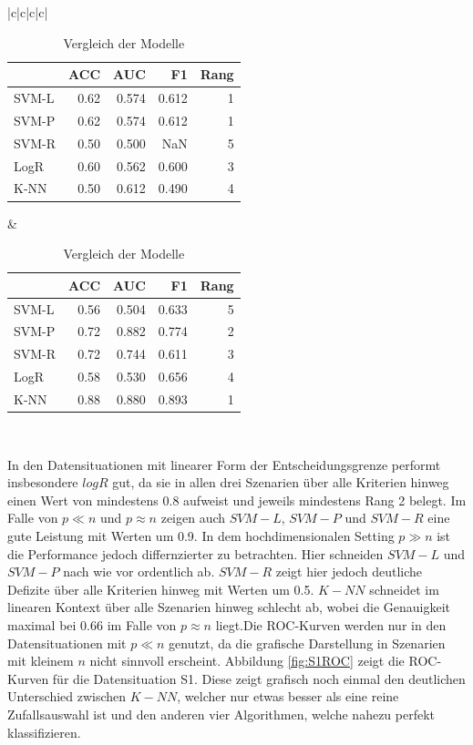\documentclass[
]{article}
\begin{document}
{\begin{landscape}
\begin{table}[h]
\begin{tabular}{|c|c|c|c|}
\begin{tabular}{lrrrr}
\toprule
  & ACC & AUC & F1 & Rang\\
\midrule
SVM-L & 0.62 & 0.574 & 0.612 & 1\\
SVM-P & 0.62 & 0.574 & 0.612 & 1\\
SVM-R & 0.50 & 0.500 & NaN & 5\\
LogR & 0.60 & 0.562 & 0.600 & 3\\
K-NN & 0.50 & 0.612 & 0.490 & 4\\
\bottomrule
\end{tabular}  &  
\begin{tabular}{lrrrr}
\toprule
  & ACC & AUC & F1 & Rang\\
\midrule
SVM-L & 0.56 & 0.504 & 0.633 & 5\\
SVM-P & 0.72 & 0.882 & 0.774 & 2\\
SVM-R & 0.72 & 0.744 & 0.611 & 3\\
LogR & 0.58 & 0.530 & 0.656 & 4\\
K-NN & 0.88 & 0.880 & 0.893 & 1\\
\bottomrule
\end{tabular}  \\ \hline \end{tabular} \caption{Vergleich der Modelle} \label{tab:TabVergleich} \end{table}

\end{landscape}
\clearpage
} In den Datensituationen mit linearer Form der Entscheidungsgrenze
performt insbesondere \(logR\) gut, da sie in allen drei Szenarien über
alle Kriterien hinweg einen Wert von mindestens 0.8 aufweist und jeweils
mindestens Rang 2 belegt. Im Falle von \(p \ll n\) und \(p \approx n\)
zeigen auch \(SVM-L\), \(SVM-P\) und \(SVM-R\) eine gute Leistung mit
Werten um 0.9. In dem hochdimensionalen Setting \(p \gg n\) ist die
Performance jedoch differnzierter zu betrachten. Hier schneiden
\(SVM-L\) und \(SVM-P\) nach wie vor ordentlich ab. \(SVM-R\) zeigt hier
jedoch deutliche Defizite über alle Kriterien hinweg mit Werten um 0.5.
\(K-NN\) schneidet im linearen Kontext über alle Szenarien hinweg
schlecht ab, wobei die Genauigkeit maximal bei 0.66 im Falle von
\(p \approx n\) liegt.\newline Die ROC-Kurven werden nur in den
Datensituationen mit \(p \ll n\) genutzt, da die grafische Darstellung
in Szenarien mit kleinem \(n\) nicht sinnvoll erscheint. Abbildung
\ref{fig:S1ROC} zeigt die ROC-Kurven für die Datensituation S1. Diese
zeigt grafisch noch einmal den deutlichen Unterschied zwischen \(K-NN\),
welcher nur etwas besser als eine reine Zufallsauswahl ist und den
anderen vier Algorithmen, welche nahezu perfekt klassifizieren.
\end{document}

